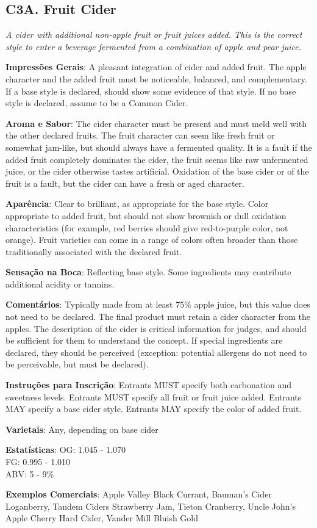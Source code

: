 \subsection*{C3A. Fruit Cider}

\textit{A cider with additional non-apple fruit or fruit juices added. This is the correct style to enter a beverage fermented from a combination of apple and pear juice.}

\textbf{Impressões Gerais}: A pleasant integration of cider and added fruit. The apple character and the added fruit must be noticeable, balanced, and complementary. If a base style is declared, should show some evidence of that style. If no base style is declared, assume to be a Common Cider.

\textbf{Aroma e Sabor}: The cider character must be present and must meld well with the other declared fruits. The fruit character can seem like fresh fruit or somewhat jam-like, but should always have a fermented quality. It is a fault if the added fruit completely dominates the cider, the fruit seems like raw unfermented juice, or the cider otherwise tastes artificial. Oxidation of the base cider or of the fruit is a fault, but the cider can have a fresh or aged character.

\textbf{Aparência}: Clear to brilliant, as appropriate for the base style. Color appropriate to added fruit, but should not show brownish or dull oxidation characteristics (for example, red berries should give red-to-purple color, not orange). Fruit varieties can come in a range of colors often broader than those traditionally associated with the declared fruit.

\textbf{Sensação na Boca}: Reflecting base style. Some ingredients may contribute additional acidity or tannins.

\textbf{Comentários}: Typically made from at least 75\% apple juice, but this value does not need to be declared. The final product must retain a cider character from the apples. The description of the cider is critical information for judges, and should be sufficient for them to understand the concept. If special ingredients are declared, they should be perceived (exception: potential allergens do not need to be perceivable, but must be declared).

\textbf{Instruções para Inscrição}: Entrants MUST specify both carbonation and sweetness levels. Entrants MUST specify all fruit or fruit juice added. Entrants MAY specify a base cider style. Entrants MAY specify the color of added fruit.

\textbf{Varietais}: Any, depending on base cider

\textbf{Estatísticas}: OG: 1.045 - 1.070 \\
\phantom{ } \hspace{16.5mm} FG: 0.995 - 1.010 \\
\phantom{ } \hspace{16.5mm} ABV: 5 - 9\%

\textbf{Exemplos Comerciais}: Apple Valley Black Currant, Bauman's Cider Loganberry, Tandem Ciders Strawberry Jam, Tieton Cranberry, Uncle John's Apple Cherry Hard Cider, Vander Mill Bluish Gold